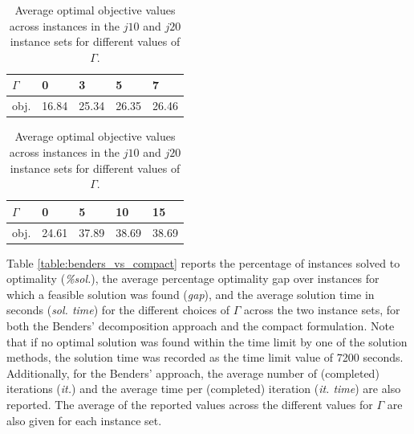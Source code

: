 \documentclass[a4paper,abstracton]{scrartcl}
\begin{document}
\begin{table}[h]
	\centering
	{\renewcommand{\arraystretch}{1.2}  %
	\begin{subtable}{.45\linewidth}
	\begin{tabular}{lllll}
		\hline\hline
		$\Gamma$  & 0     & 3     & 5     & 7 \\
		\hline
		obj. & 16.84 & 25.34 & 26.35 & 26.46 \\               
		\hline\hline
	\end{tabular}
	\caption{$j10$}
	\label{table:j10_objvals}
	\end{subtable}%
	\qquad
	\begin{subtable}{.45\linewidth}
	\begin{tabular}{lllll}
		\hline\hline
		$\Gamma$  & 0     & 5     & 10     & 15 \\
		\hline
		obj. & 24.61 & 37.89 & 38.69 & 38.69 \\               
		\hline\hline
	\end{tabular}
	\caption{$j20$}
	\label{table:j20_objvals}
	\end{subtable}
	\caption{Average optimal objective values across instances in the $j10$ and $j20$ instance sets for different values of $\Gamma$.}
	\label{table:objvals}}
\end{table}

Table \ref{table:benders_vs_compact} reports the percentage of instances solved to optimality (\textit{\%sol.}), the average percentage optimality gap over instances for which a feasible solution was found (\textit{gap}), and the average solution time in seconds (\textit{sol. time}) for the different choices of $\Gamma$ across the two instance sets, for both the Benders' decomposition approach and the compact formulation. Note that if no optimal solution was found within the time limit by one of the solution methods, the solution time was recorded as the time limit value of 7200 seconds. Additionally, for the Benders' approach, the average number of (completed) iterations (\textit{it.}) and the average time per (completed) iteration (\textit{it. time}) are also reported. The average of the reported values across the different values for $\Gamma$ are also given for each instance set. 

\end{document}
